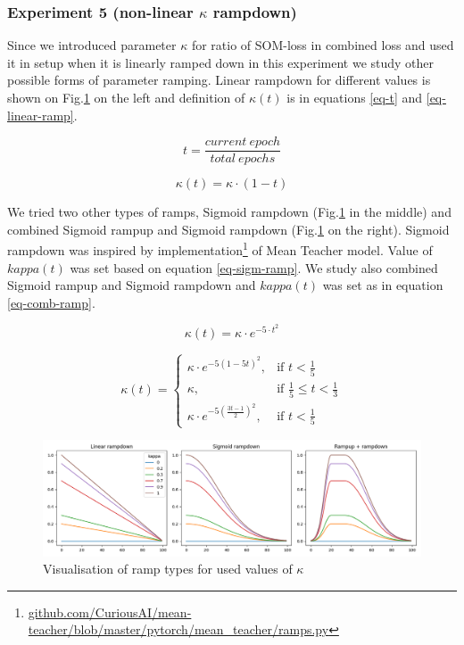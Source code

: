 \subsubsection{Experiment 5 (non-linear $\kappa$ rampdown)}

Since we introduced parameter $\kappa$ for ratio of SOM-loss in combined loss and used it in setup when it is linearly ramped down in this experiment we study other possible forms of parameter ramping. Linear rampdown for different values is shown on Fig.\ref{fig:ramps} on the left and definition of $\kappa(t)$ is in equations \ref{eq-t} and \ref{eq-linear-ramp}.

\begin{equation}
    t = \frac{current\ epoch}{total\ epochs}
    \label{eq-t}
\end{equation}

\begin{equation}
    \kappa(t) = \kappa \cdot (1 - t) 
    \label{eq-linear-ramp}
\end{equation}

We tried two other types of ramps, Sigmoid rampdown (Fig.\ref{fig:ramps} in the middle) and combined Sigmoid rampup and Sigmoid rampdown (Fig.\ref{fig:ramps} on the right). Sigmoid rampdown was inspired by implementation\footnote{\url{github.com/CuriousAI/mean-teacher/blob/master/pytorch/mean_teacher/ramps.py}} of Mean Teacher model. Value of $kappa(t)$ was set based on equation \ref{eq-sigm-ramp}. We study also combined Sigmoid rampup and Sigmoid rampdown and $kappa(t)$ was set as in equation \ref{eq-comb-ramp}.

\begin{equation}
    \kappa(t) = \kappa \cdot e^{-5 \cdot t^2}
    \label{eq-sigm-ramp}
\end{equation}

\begin{equation}
    \kappa(t) = \begin{cases}
		      \kappa \cdot e^{-5  (1-5t)^2}, & \text{if $t < \frac{1}{5}$ }\\
            \kappa, & \text{if $\frac{1}{5} \leq t < \frac{1}{3}$}\\
            \kappa \cdot e^{-5  (\frac{3t - 1}{2})^2}, & \text{if $t < \frac{1}{5}$ }
		 \end{cases}
    \label{eq-comb-ramp}
\end{equation}




\begin{figure}[h!]
    \centering
    \includegraphics[width=1\textwidth]{figs/ramps.png}
    \caption{Visualisation of ramp types for used values of $\kappa$}
    \label{fig:ramps}
\end{figure}

